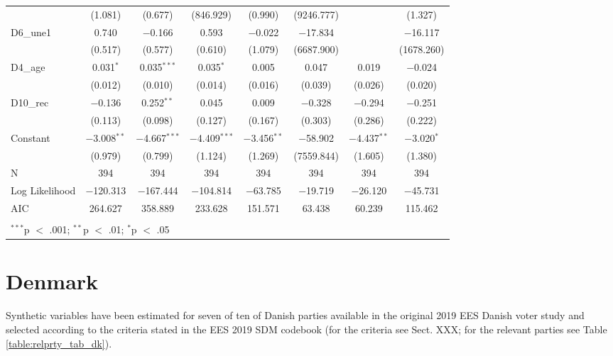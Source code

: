 \documentclass[
]{article}
\begin{document}
\begin{table}[!htbp]
\begin{tabular}{@{\extracolsep{5pt}}lccccccc}
  & (1.081) & (0.677) & (846.929) & (0.990) & (9246.777) &  & (1.327) \\ 
  D6\_une1 & 0.740 & $-$0.166 & 0.593 & $-$0.022 & $-$17.834 &  & $-$16.117 \\ 
  & (0.517) & (0.577) & (0.610) & (1.079) & (6687.900) &  & (1678.260) \\ 
  D4\_age & 0.031$^{*}$ & 0.035$^{***}$ & 0.035$^{*}$ & 0.005 & 0.047 & 0.019 & $-$0.024 \\ 
  & (0.012) & (0.010) & (0.014) & (0.016) & (0.039) & (0.026) & (0.020) \\ 
  D10\_rec & $-$0.136 & 0.252$^{**}$ & 0.045 & 0.009 & $-$0.328 & $-$0.294 & $-$0.251 \\ 
  & (0.113) & (0.098) & (0.127) & (0.167) & (0.303) & (0.286) & (0.222) \\ 
  Constant & $-$3.008$^{**}$ & $-$4.667$^{***}$ & $-$4.409$^{***}$ & $-$3.456$^{**}$ & $-$58.902 & $-$4.437$^{**}$ & $-$3.020$^{*}$ \\ 
  & (0.979) & (0.799) & (1.124) & (1.269) & (7559.844) & (1.605) & (1.380) \\ 
 N & 394 & 394 & 394 & 394 & 394 & 394 & 394 \\ 
Log Likelihood & $-$120.313 & $-$167.444 & $-$104.814 & $-$63.785 & $-$19.719 & $-$26.120 & $-$45.731 \\ 
AIC & 264.627 & 358.889 & 233.628 & 151.571 & 63.438 & 60.239 & 115.462 \\ 
\hline \\[-1.8ex] 
\multicolumn{8}{l}{$^{***}$p $<$ .001; $^{**}$p $<$ .01; $^{*}$p $<$ .05} \\ 
\end{tabular} 
\end{table}

\clearpage

\newpage

\hypertarget{denmark}{%
\section{Denmark}\label{denmark}}

Synthetic variables have been estimated for seven of ten of Danish parties available in the original
2019 EES Danish voter study and selected according to the criteria stated in the EES 2019 SDM codebook (for the criteria see Sect. XXX; for the relevant parties see Table \ref{table:relprty_tab_dk}).
\end{document}
